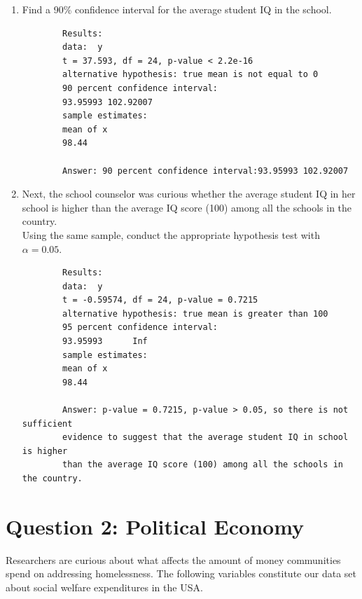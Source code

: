 \documentclass[12pt,letterpaper]{article}
\begin{document}
\begin{enumerate}
	\item Find a 90\% confidence interval for the average student IQ in the school.\\
	
	  
	
	\begin{verbatim} 
		Results: 
		data:  y
		t = 37.593, df = 24, p-value < 2.2e-16
		alternative hypothesis: true mean is not equal to 0
		90 percent confidence interval:
		93.95993 102.92007
		sample estimates:
		mean of x 
		98.44 
		
		Answer: 90 percent confidence interval:93.95993 102.92007
	\end{verbatim}
	
	
	\item Next, the school counselor was curious  whether  the average student IQ in her school is higher than the average IQ score (100) among all the schools in the country.\\ 
	
	\noindent Using the same sample, conduct the appropriate hypothesis test with $\alpha=0.05$.
	
	  
	
	\begin{verbatim} 
		Results:
		data:  y
		t = -0.59574, df = 24, p-value = 0.7215
		alternative hypothesis: true mean is greater than 100
		95 percent confidence interval:
		93.95993      Inf
		sample estimates:
		mean of x 
		98.44 
		
		Answer: p-value = 0.7215, p-value > 0.05, so there is not sufficient 
		evidence to suggest that the average student IQ in school is higher 
		than the average IQ score (100) among all the schools in the country.
	\end{verbatim}
	
	
\end{enumerate}

\newpage

	\section*{Question 2: Political Economy}

\noindent Researchers are curious about what affects the amount of money communities spend on addressing homelessness. The following variables constitute our data set about social welfare expenditures in the USA. \\
\vspace{.5cm}
\end{document}
